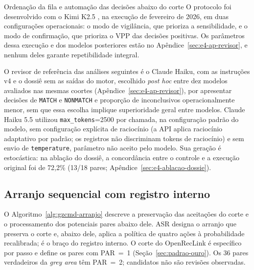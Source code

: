 \begin{chapter}{Ordenação da fila e automação das decisões abaixo do corte}
O protocolo foi desenvolvido com o Kimi K2.5 \cite{KimiK2_5_2025}, na execução de fevereiro de 2026, em duas configurações operacionais: o modo de vigilância, que prioriza a sensibilidade, e o modo de confirmação, que prioriza o VPP das decisões positivas. Os parâmetros dessa execução e dos modelos posteriores estão no Apêndice~\ref{sec:e4-ap-revisor}, e nenhum deles garante repetibilidade integral.

O revisor de referência das análises seguintes é o Claude Haiku, com as instruções v4 e o dossiê sem as saídas do motor, escolhido \textit{post hoc} entre dez modelos avaliados nas mesmas coortes (Apêndice~\ref{sec:e4-ap-revisor}), por apresentar decisões de \texttt{MATCH} e \texttt{NONMATCH} e proporção de inconclusivos operacionalmente menor, sem que essa escolha implique superioridade geral entre modelos. Claude Haiku 5.5 utilizou \texttt{max\_tokens}=2500 por chamada, na configuração padrão do modelo, sem configuração explícita de raciocínio (a API aplica raciocínio adaptativo por padrão; os registros não discriminam tokens de raciocínio) e sem envio de \texttt{temperature}, parâmetro não aceito pelo modelo. Sua geração é estocástica: na ablação do dossiê, a concordância entre o controle e a execução original foi de 72,2\% (13/18 pares; Apêndice~\ref{sec:e4-ablacao-dossie}).

\subsection{Arranjo sequencial com registro interno}\label{sec:e4-arranjo-metodo}

O Algoritmo~\ref{alg:gzcmd-arranjo} descreve a preservação das aceitações do corte e o processamento dos potenciais pares abaixo dele. ASR designa o arranjo que preserva o corte e, abaixo dele, aplica a política de quatro ações à probabilidade recalibrada; é o braço do registro interno. O corte do OpenRecLink é específico por passo e define os pares com PAR~=~1 (Seção~\ref{sec:padrao-ouro}). Os 36 pares verdadeiros da \textit{grey area} têm PAR~=~2; candidatos não são revisões observadas.


\end{chapter}
